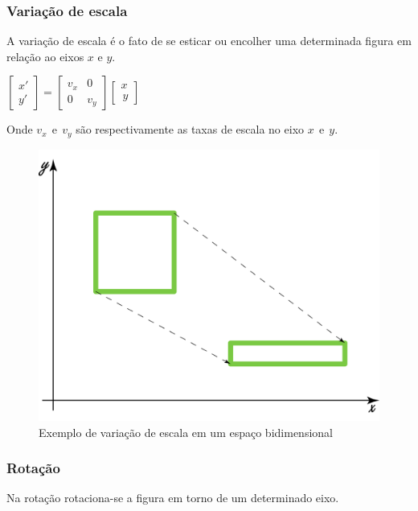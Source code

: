 \documentclass[9pt, a4paper, nofonttune, journal]{IEEEtran}
\begin{document}
\subsubsection{Variação de escala}

A variação de escala é o fato de se esticar ou encolher uma determinada figura em relação ao eixos $x$ e $y$.

\begin{center}
$\begin{bmatrix}x'\\
y'
\end{bmatrix}=\begin{bmatrix}v_{x} & 0\\
0 & v_{y}
\end{bmatrix}\begin{bmatrix}x\\
\frac{}{}y
\end{bmatrix}$\end{center}
Onde $v_{x}~~ \textrm{e} ~~ v_{y}$ são respectivamente as taxas de escala no eixo $x~~ \textrm{e} ~~y$.\cite{CGPPBook1}


\begin{figure}[H]
\begin{center}
\includegraphics[scale=0.25]{figuras/scale1}
\caption{Exemplo de variação de escala em um espaço bidimensional}
\end{center}
\end{figure}


\subsubsection{Rotação}
Na rotação rotaciona-se a figura em torno de um determinado eixo.
\end{document}
